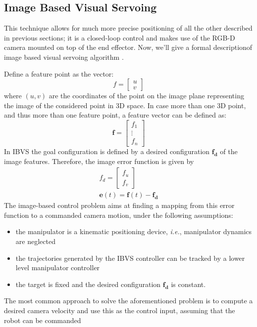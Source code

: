 \subsection{Image Based Visual Servoing}\label{subsec:visualServoing}
This technique allows for much more precise positioning of all the other described in previous sections; it is a closed-loop control and makes use of the RGB-D camera mounted on top of the end effector. Now, we'll give a formal descriptionof image based visual servoing algorithm \parencite{imageBasedVisualServo}.
\par
Define a feature point as the vector: 
\[
f = \left[\begin{array}{c}u \\v\end{array}\right]
\]
where $(u,v)$ are the coordinates of the point on the image plane representing the image of the considered point in 3D space. In case more than one 3D point, and thus more than one feature point, a feature vector can be defined as:
\[
\boldsymbol{f} = \left[\begin{array}{c}f_1 \\ \vdots \\ f_n\end{array}\right]
\]
In IBVS the goal configuration is defined by a desired configuration $\boldsymbol{f_d}$ of the image features. Therefore, the image error function is given by
\begin{align*}
f_d=\left[\begin{array}{c} f_u \\ f_v \end{array}\right] \\
\boldsymbol{e}(t)=\boldsymbol{f}(t)-\boldsymbol{f_d}
\end{align*}
The image-based control problem aims at finding a mapping from this error function to a
commanded camera motion, under the following assumptions:
\begin{itemize}
	\item the manipulator is a kinematic positioning device, \textit{i.e.}, manipulator dynamics are neglected
	\item the trajectories generated by the IBVS controller can be tracked by a lower level
manipulator controller
	\item the target is fixed and the desired configuration $\boldsymbol{f_d}$ is constant.
\end{itemize}
The most common approach to solve the aforementioned problem is to compute a desired
camera velocity and use this as the control input, assuming that the robot can be commanded
